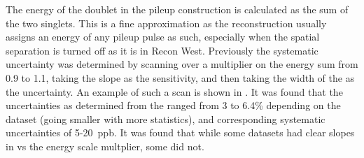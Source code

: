 The energy of the doublet in the pileup construction is calculated as the sum of the two singlets. This is a fine approximation as the reconstruction usually assigns an energy of any pileup pulse as such, especially when the spatial separation is turned off as it is in Recon West. Previously the systematic uncertainty was determined by scanning over a multiplier on the energy sum from 0.9 to 1.1, taking the slope as the sensitivity, and then taking the width of the \chisq as the uncertainty. An example of such a scan is shown in . It was found that the uncertainties as determined from the \chisq ranged from 3 to 6.4\% depending on the dataset (going smaller with more statistics), and corresponding systematic uncertainties of 5-20~ppb. It was found that while some datasets had clear slopes in \R vs the energy scale multplier, some did not.



